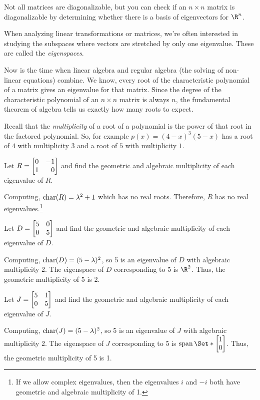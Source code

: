 \begin{emphbox}[Takeaway]
	Not all matrices are diagonalizable, but you can check if an $n\times n$
	matrix is diagonalizable by determining whether there is a basis of eigenvectors for $\R^n$.
\end{emphbox}


When analyzing linear transformations or matrices, we're often interested in
studying the subspaces where vectors are stretched by only one eigenvalue. These 
are called the \emph{eigenspaces}.


Now is the time when linear algebra and regular algebra (the solving of non-linear equations)
combine. We know, every root of the characteristic polynomial of a matrix gives an eigenvalue
for that matrix. Since the degree of the characteristic polynomial of an $n\times n$ matrix
is always $n$, the fundamental theorem of algebra tells us exactly how many roots to expect.

Recall that the \emph{multiplicity} of a root of a polynomial is the power of that root
in the factored polynomial. So, for example $p(x)=(4-x)^3(5-x)$ has a root of $4$ with multiplicity
$3$ and a root of $5$ with multiplicity $1$.

\begin{example}
	Let $R=\mat{0&-1\\1&0}$ and find the geometric and algebraic multiplicity of each eigenvalue of $R$.
	
	Computing, $\operatorname{char}(R)=\lambda^2+1$ which has no real roots. Therefore,
	$R$ has no real eigenvalues.\footnote{ If we allow complex eigenvalues, then the eigenvalues
	$i$ and $-i$ both have geometric and algebraic multiplicity of 1.}
\end{example}

\begin{example}
	Let $D=\mat{5&0\\0&5}$ and find the geometric and algebraic multiplicity of each eigenvalue of $D$.
	
	Computing, $\operatorname{char}(D)=(5-\lambda)^2$, so 5 is an eigenvalue of $D$ with algebraic multiplicity 2.
	The eigenspace of $D$ corresponding to 5 is $\R^2$. Thus, the geometric multiplicity of 5 is 2.
\end{example}

\begin{example}
	Let $J=\mat{5&1\\0&5}$ and find the geometric and algebraic multiplicity of each eigenvalue of $J$.
	
	Computing, $\operatorname{char}(J)=(5-\lambda)^2$, so 5 is an eigenvalue of $J$ with algebraic multiplicity 2.
	The eigenspace of $J$ corresponding to 5 is $\Span\Set*{\mat{1\\0}}$. Thus, the geometric 
	multiplicity of 5 is 1.
\end{example}

